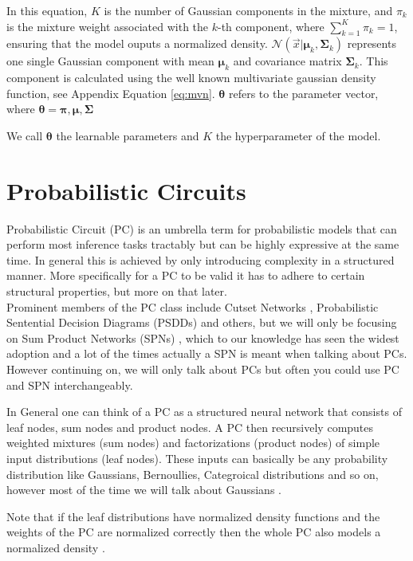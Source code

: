 In this equation, $K$ is the number of Gaussian components in the mixture, and $\pi_k$ is the mixture weight associated with the $k$-th component, where $\sum_{k=1}^K \pi_k = 1$, ensuring that the model 
ouputs a normalized density. $\mathcal{N}(\vec x|\boldsymbol{\mu}_k, \boldsymbol{\Sigma}_k)$ represents one single Gaussian component with mean $\boldsymbol{\mu}_k$ and 
covariance matrix $\boldsymbol{\Sigma}_k$. This component is calculated using the well known multivariate gaussian density function, see Appendix Equation \ref{eq:mvn}.
$\boldsymbol{\theta}$ refers to the parameter vector, where $\boldsymbol{\theta} = {\boldsymbol{\pi}, \boldsymbol{\mu}, \boldsymbol{\Sigma}}$

We call $\boldsymbol{\theta}$ the learnable parameters and $K$ the hyperparameter of the model.

\section{Probabilistic Circuits}
\label{sec:pc}

Probabilistic Circuit (PC) \cite{pc_intro} is an umbrella term for probabilistic models that can perform most inference tasks tractably but can be 
highly expressive at the same time. In general this is achieved by only introducing complexity in a structured manner. More specifically
for a PC to be valid it has to adhere to certain structural properties, but more on that later. \\

Prominent members of the PC class include Cutset Networks \cite{cutset}, Probabilistic
Sentential Decision Diagrams (PSDDs) \cite{psdd} and others, but we will only be focusing on Sum Product Networks (SPNs) \cite{spn}, which to our 
knowledge has seen the widest adoption and a lot of the times actually a SPN is meant when talking about PCs. However continuing on, we will only talk about 
PCs but often you could use PC and SPN interchangeably. 

In General one can think of a PC as a structured neural network that consists of leaf nodes, sum nodes and product 
nodes. A PC then recursively computes weighted mixtures (sum nodes) and factorizations (product nodes) of simple input distributions (leaf nodes). 
These inputs can basically be any probability distribution like Gaussians, Bernoullies, Categroical distributions and so on,
however most of the time we will talk about Gaussians \cite{pc_intro}.

Note that if the leaf distributions have normalized density functions and the weights of the PC are
normalized correctly then the whole PC also models a normalized density \cite{pc_intro}.

